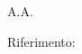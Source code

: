 \begin{titlepage}
  \centering
  \vspace*{5cm}
  {\Huge\bfseries\color{accento}\corso\par}
  \vspace{1em}
  {\Large\sottotitolo\par}
  \vspace{3em}
  {\large\autore\par}
  \vspace{0.5em}
  {\normalsize A.A.~\annoaccademico\par}
  \vfill
  {\small\color{grigio}Riferimento: \riferimento\par}
\end{titlepage}
